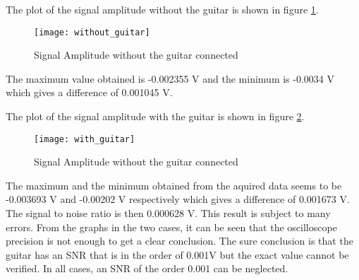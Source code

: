 The plot of the signal amplitude without the guitar is shown in figure \ref{fig:without_guitar}. 

\begin{figure}[hbt]
  \centering
  \texttt{[image: without\_guitar]}
  \caption{Signal Amplitude without the guitar connected}
  \label{fig:without_guitar}
\end{figure}

The maximum value obtained is -0.002355 V and the minimum is -0.0034 V which gives a difference of 0.001045 V. 

The plot of the signal amplitude with the guitar is shown in figure \ref{fig:with_guitar}. 

\begin{figure}[hbt]
  \centering
  \texttt{[image: with\_guitar]}
  \caption{Signal Amplitude without the guitar connected}
  \label{fig:with_guitar}
\end{figure}

The maximum and the minimum obtained from the aquired data seems to be -0.003693 V and -0.00202 V respectively which gives a difference of 0.001673 V. 
The signal to noise ratio is then 0.000628 V. 
This result is subject to many errors. From the graphs in the two cases, it can be seen that the oscilloscope precision is not enough to get a clear conclusion. The sure conclusion is that the guitar has an SNR that is in the order of 0.001V but the exact value cannot be verified. In all cases, an SNR of the order 0.001 can be neglected. 